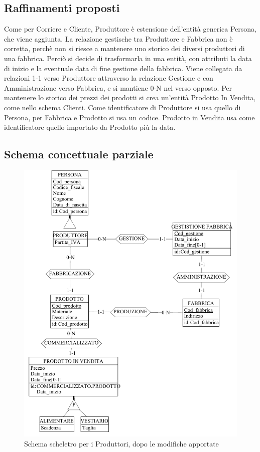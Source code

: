 \documentclass[a4paper,12pt]{report}
\begin{document}
\subsection{Raffinamenti proposti}
Come per Corriere e Cliente, Produttore è estensione dell'entità generica Persona, che viene aggiunta. 
La relazione gestische tra Produttore e Fabbrica non è corretta, perchè non si riesce a mantenere uno storico dei diversi produttori di una fabbrica.
Perciò si decide di trasformarla in una entità, con attributi la data di inizio e la eventuale data di fine gestione della fabbrica. Viene collegata da relazioni 1-1 verso Produttore attraverso la relazione Gestione e con Amministrazione verso Fabbrica, e si mantiene 0-N nel verso opposto.
Per mantenere lo storico dei prezzi dei prodotti si crea un'entità Prodotto In Vendita, come nello schema Clienti.
Come identificatore di Produttore si usa quello di Persona, per Fabbrica e Prodotto si usa un codice. Prodotto in Vendita usa come identificatore quello importato da Prodotto più la data.
\subsection{Schema concettuale parziale}
\begin{figure}[h]
	\centering{}
	\includegraphics[width=\textwidth]{img/SchemaConcettuale-Produttori2.pdf}
	\caption{Schema scheletro per i Produttori, dopo le modifiche apportate}
\end{figure}
\end{document}
